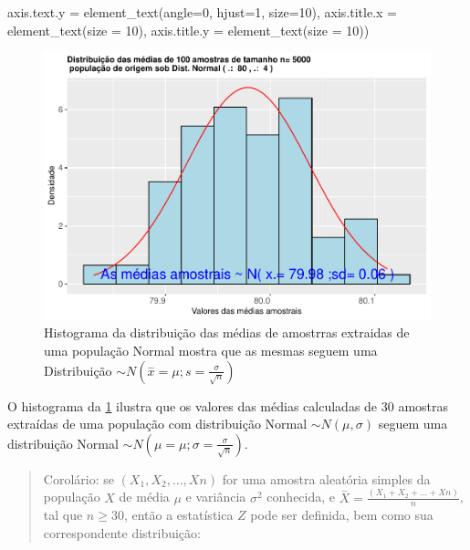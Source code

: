 \documentclass[
]{book}
\newenvironment{Shaded}{\begin{snugshade}}{\end{snugshade}}
\newcommand{\AttributeTok}[1]{\textcolor[rgb]{0.77,0.63,0.00}{#1}}
\newcommand{\DecValTok}[1]{\textcolor[rgb]{0.00,0.00,0.81}{#1}}
\newcommand{\FunctionTok}[1]{\textcolor[rgb]{0.00,0.00,0.00}{#1}}
\newcommand{\NormalTok}[1]{#1}
\begin{document}
\begin{Shaded}
\begin{Highlighting}[]
        \AttributeTok{axis.text.y =} \FunctionTok{element\_text}\NormalTok{(}\AttributeTok{angle=}\DecValTok{0}\NormalTok{, }\AttributeTok{hjust=}\DecValTok{1}\NormalTok{, }\AttributeTok{size=}\DecValTok{10}\NormalTok{),}
        \AttributeTok{axis.title.x =} \FunctionTok{element\_text}\NormalTok{(}\AttributeTok{size =} \DecValTok{10}\NormalTok{),}
        \AttributeTok{axis.title.y =} \FunctionTok{element\_text}\NormalTok{(}\AttributeTok{size =} \DecValTok{10}\NormalTok{))}
\end{Highlighting}
\end{Shaded}

\begin{figure}

{\centering \includegraphics[width=1\linewidth]{apostila_files/figure-latex/fig51-1} 

}

\caption{Histograma da distribuição das médias de amostrras extraidas de uma população  Normal mostra que as mesmas seguem uma Distribuição $\sim N (\stackrel{-}{x}= \mu; s=\frac{\sigma}{\sqrt{n}})$}\label{fig:fig51}
\end{figure}

\hfill\break

O histograma da \ref{fig:fig51} ilustra que os valores das médias calculadas de 30 amostras extraídas de uma população com distribuição Normal \(\sim N (\mu, \sigma)\) seguem uma distribuição Normal \(\sim N (\mu= \mu; \sigma=\frac{\sigma}{\sqrt{n}})\).

\hfill\break

\begin{quote}
Corolário: se \((X_{1}, X_{2},...,X{n})\) for uma amostra aleatória simples da população \(X\) de média \(\mu\) e variância \(\sigma^{2}\) conhecida, e \(\stackrel{-}{X}= \frac{(X_{1}+X_{2}+...+X{n})}{n}\), tal que \(n\ge 30\), então a estatística \(Z\) pode ser definida, bem como sua correspondente distribuição:
\end{quote}
\end{document}

